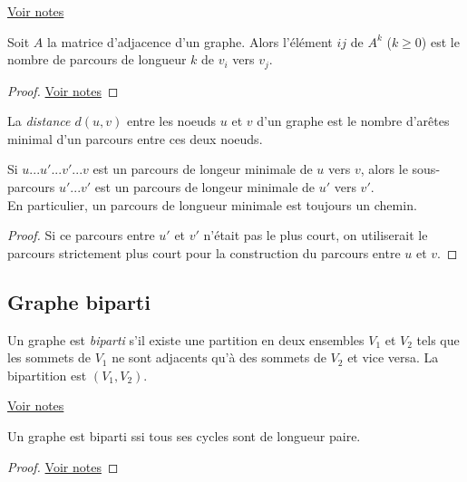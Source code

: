 \begin{myexem}
  \href{https://dl.dropboxusercontent.com/u/44092863/Graph_Theory_Romain_Capron.pdf}{Voir notes} \addTODO
\end{myexem}

\begin{mytheo} 
  Soit $A$ la matrice d'adjacence d'un graphe. Alors l'élément $ij$ de $A^k$ ($k \geq 0$) est le nombre de parcours de longueur $k$ de $v_i$ vers $v_j$.
  \begin{proof}
     \href{https://dl.dropboxusercontent.com/u/44092863/Graph_Theory_Romain_Capron.pdf}{Voir notes} \addTODO
  \end{proof}
\end{mytheo}

\begin{mydef}
  La \emph{distance $d(u, v)$} entre les noeuds $u$ et $v$ d'un graphe est le nombre d'arêtes minimal d'un parcours entre ces deux noeuds.
\end{mydef}

\begin{mylem}
  Si $u...u'...v'...v$ est un parcours de longeur minimale de $u$ vers $v$, alors le sous-parcours $u'...v'$ est un parcours de longeur minimale de $u'$ vers $v'$.\\
  En particulier, un parcours de longueur minimale est toujours un chemin.
  \begin{proof}
    Si ce parcours entre $u'$ et $v'$ n'était pas le plus court, on utiliserait le parcours strictement plus court pour la construction du parcours entre $u$ et $v$.
  \end{proof}
\end{mylem}

\subsection{Graphe biparti}
\begin{mydef}
  Un graphe est \emph{biparti}  s'il existe une partition en deux ensembles $V_1$ et $V_2$ tels que les sommets de $V_1$ ne sont adjacents qu'à des sommets de $V_2$ et vice versa. La bipartition est $(V_1, V_2)$.
\end{mydef}

\begin{myexem}
  \href{https://dl.dropboxusercontent.com/u/44092863/Graph_Theory_Romain_Capron.pdf}{Voir notes} \addTODO
\end{myexem}

\begin{mytheo} 
  Un graphe est biparti ssi tous ses cycles sont de longueur paire.
  \begin{proof}
     \href{https://dl.dropboxusercontent.com/u/44092863/Graph_Theory_Romain_Capron.pdf}{Voir notes} \addTODO
  \end{proof}
\end{mytheo}
